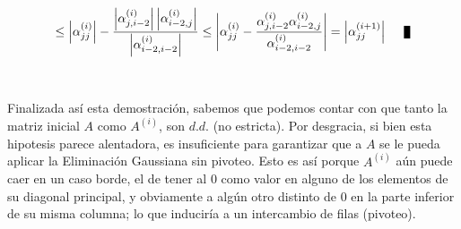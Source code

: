 \begin{equation}
\leq \left | \alpha_{jj}^{(i)} \right | - \frac{\left | \alpha_{j,i-2}^{(i)} \right | \left |\alpha_{i-2,j}^{(i)} \right | }{ \left | \alpha_{i-2,i-2}^{(i)} \right | } \leq \left | \alpha_{jj}^{(i)} - \frac{\alpha_{j,i-2}^{(i)}\alpha_{i-2,j}^{(i)}}{\alpha_{i-2,i-2}^{(i)}} \right | = \left | \alpha_{jj}^{(i+1)} \right | \qed
\end{equation}
\\
\\
Finalizada así esta demostraci\'on, sabemos que podemos contar con que tanto la matriz inicial $A$ como $A^{(i)}$, son $d.d.$ (no estricta). Por desgracia, si bien esta hipotesis parece alentadora, es insuficiente para garantizar que a $A$ se le pueda aplicar la Eliminaci\'on Gaussiana sin pivoteo. Esto es así porque $A^{(i)}$ a\'un puede caer en un caso borde, el de tener al $0$ como valor en alguno de los elementos de su diagonal principal, y obviamente a alg\'un otro distinto de $0$ en la parte inferior de su misma columna; lo que induciría a un intercambio de filas (pivoteo).

